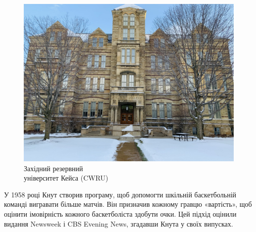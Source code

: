 \documentclass{article}
\begin{document}
\begin{figure}[h!]
	\hfill\hfill\hfill
	\begin{minipage}[c]{0.5\textwidth}
		\includegraphics[width=\linewidth]{CWRU}
	\end{minipage}
	\hfill
	\begin{minipage}[c]{0.38\textwidth}
		\caption{Західний резервний\\університет Кейса (CWRU)}
		\label{pic: CWRU}
	\end{minipage}
	\hfill\hfill\hfill
\end{figure}

У 1958 році Кнут створив програму, щоб допомогти шкільній баскетбольній команді вигравати більше матчів. Він призначив кожному гравцю
«вартість», щоб оцінити імовірність кожного баскетболіста здобути очки. Цей підхід оцінили видання Newsweek і CBS Evening News, згадавши Кнута
у своїх випусках.
\end{document}
